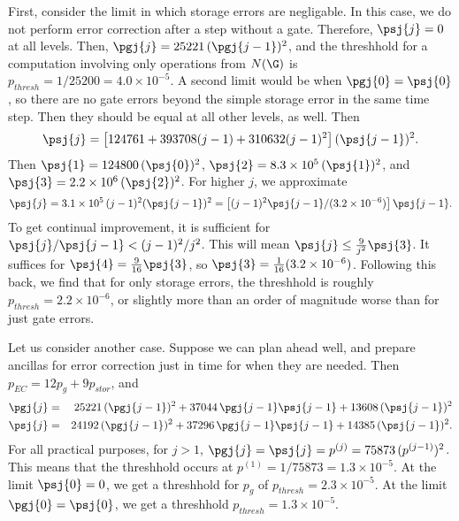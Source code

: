 First, consider the limit in which storage errors are negligable.  In this
case, we do not perform error correction after a step without a gate.
Therefore, $\psj{j} = 0$ at all levels.  Then, $\pgj{j} = 25221\,(\pgj{j-1})^2$,
and the threshhold for a computation involving only operations from $N(\G)$ is
$p_{thresh} = 1/25200 = 4.0 \times 10^{-5}$.  A second limit would be when
$\pgj{0} = \psj{0}$, so there are no gate errors beyond the simple storage
error in the same time step.  Then they should be equal at all other levels,
as well.  Then
\begin{equation}
	\psj{j} = \left[124761 + 393708 (j-1) + 310632 (j-1)^2 \right] (\psj{j-1})^2.
\end{equation}
Then $\psj{1} = 124800\,(\psj{0})^2$, $\psj{2} = 8.3 \times 10^5\,(\psj{1})^2$,
and $\psj{3} = 2.2 \times 10^6\,(\psj{2})^2$.  For higher $j$, we approximate
\begin{equation}
	\psj{j} = 3.1 \times 10^5\,(j-1)^2 (\psj{j-1})^2 = \left[ (j-1)^2
	\psj{j-1}/ (3.2 \times 10^{-6}) \right] \psj{j-1}.
\end{equation}
To get continual improvement, it is sufficient for $\psj{j}/\psj{j-1} < (j-
1)^2/j^2$.  This will mean $\psj{j} \leq \frac{9}{j^2} \psj{3}$.  It suffices
for $\psj{4} = \frac{9}{16} \psj{3}$, so $\psj{3} = \frac{1}{16} (3.2 \times
10^{-6})$.  Following this back, we find that for only storage errors, the
threshhold is roughly $p_{thresh} = 2.2 \times 10^{-6}$, or slightly more
than an order of magnitude worse than for just gate errors.

Let us consider another case.  Suppose we can plan ahead well, and
prepare ancillas for error correction just in time for when they are needed.
Then $p_{EC} = 12 p_g + 9 p_{stor}$, and
\begin{eqnarray}
	\pgj{j} & = & 25221\,(\pgj{j-1})^2 + 37044\,\pgj{j-1} \psj{j-1} + 13608\,
	(\psj{j-1})^2 \\
	\psj{j} & = & 24192\,(\pgj{j-1})^2 + 37296\,\pgj{j-1} \psj{j-1} + 14385\,
	(\psj{j-1})^2.
\end{eqnarray}
For all practical purposes, for $j > 1$, $\pgj{j} = \psj{j} = p^{(j)} = 75873\,
(p^{(j-1)})^2$.  This means that the threshhold occurs at $p^{(1)} = 1/75873 =
1.3 \times 10^{-5}$.  At the limit $\psj{0} = 0$, we get a threshhold for
$p_g$ of $p_{thresh} = 2.3 \times 10^{-5}$.  At the limit $\pgj{0} = \psj{0}$,
we get a threshhold $p_{thresh} = 1.3 \times 10^{-5}$.


